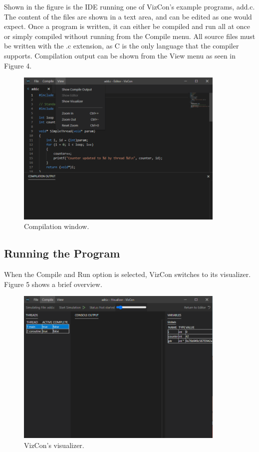 \documentclass{article}
\begin{document}
Shown in the figure is the IDE running one of VizCon's example programs, add.c. The content of the files are shown in a text area, and can be edited as one would expect. Once a program is written, it can either be compiled and run all at once or simply compiled without running from the Compile menu. All source files must be written with the .c extension, as C is the only language that the compiler supports. Compilation output can be shown from the View menu as seen in Figure 4.
\begin{figure}[H]
    \includegraphics[width=10cm]{vizconCompiler}
    \centering
    \caption{Compilation window.}
\end{figure}

\subsection{Running the Program}
When the Compile and Run option is selected, VizCon switches to its visualizer. Figure 5 shows a brief overview. 
\begin{figure}[H]
    \includegraphics[width=10cm]{vizconVisualizer}
    \centering
    \caption{VizCon's visualizer.}
\end{figure}
\end{document}
